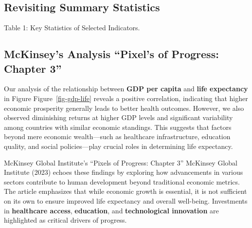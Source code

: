\documentclass[
]{article}
\begin{document}
\subsection{Revisiting Summary
Statistics}\label{revisiting-summary-statistics}

\begin{table}

\caption{\label{tbl-key-stats}Table 1: Key Statistics of Selected
Indicators.}


\end{table}%

\subsection{McKinsey's Analysis ``Pixel's of Progress: Chapter
3''}\label{mckinseys-analysis-pixels-of-progress-chapter-3}

Our analysis of the relationship between \textbf{GDP per capita} and
\textbf{life expectancy} in Figure Figure~\ref{fig-gdp-life} reveals a
positive correlation, indicating that higher economic prosperity
generally leads to better health outcomes. However, we also observed
diminishing returns at higher GDP levels and significant variability
among countries with similar economic standings. This suggests that
factors beyond mere economic wealth---such as healthcare infrastructure,
education quality, and social policies---play crucial roles in
determining life expectancy.

McKinsey Global Institute's ``Pixels of Progress: Chapter 3'' McKinsey
Global Institute (2023) echoes these findings by exploring how
advancements in various sectors contribute to human development beyond
traditional economic metrics. The article emphasizes that while economic
growth is essential, it is not sufficient on its own to ensure improved
life expectancy and overall well-being. Investments in
\textbf{healthcare access}, \textbf{education}, and
\textbf{technological innovation} are highlighted as critical drivers of
progress.
\end{document}
